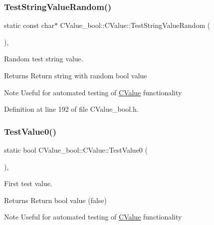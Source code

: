 \subsubsection{\texorpdfstring{Test\+String\+Value\+Random()}{TestStringValueRandom()}}
{\footnotesize\ttfamily static const char$\ast$ C\+Value\+\_\+bool\+::\+C\+Value\+::\+Test\+String\+Value\+Random (\begin{DoxyParamCaption}{ }\end{DoxyParamCaption})\hspace{0.3cm}{\ttfamily [inline]}, {\ttfamily [static]}}



Random test string value. 

\begin{DoxyReturn}{Returns}
Return string with random {\ttfamily bool} value 
\end{DoxyReturn}
\begin{DoxyNote}{Note}
Useful for automated testing of \hyperlink{class_c_value__bool_1_1_c_value}{C\+Value} functionality 
\end{DoxyNote}


Definition at line 192 of file C\+Value\+\_\+bool.\+h.

\mbox{\label{class_c_value__bool_1_1_c_value_a6a39f590a87bb4be8f707c032ca2b32b}} 
\subsubsection{\texorpdfstring{Test\+Value0()}{TestValue0()}}
{\footnotesize\ttfamily static bool C\+Value\+\_\+bool\+::\+C\+Value\+::\+Test\+Value0 (\begin{DoxyParamCaption}{ }\end{DoxyParamCaption})\hspace{0.3cm}{\ttfamily [inline]}, {\ttfamily [static]}}



First test value. 

\begin{DoxyReturn}{Returns}
Return {\ttfamily bool} value ({\ttfamily false}) 
\end{DoxyReturn}
\begin{DoxyNote}{Note}
Useful for automated testing of \hyperlink{class_c_value__bool_1_1_c_value}{C\+Value} functionality 
\end{DoxyNote}


